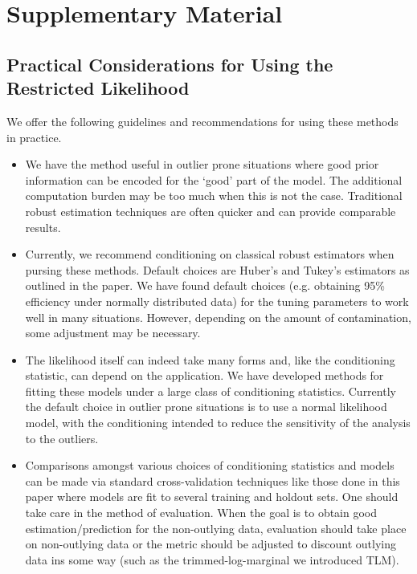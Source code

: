 \documentclass[ba]{imsart}
\begin{document}
\section{Supplementary Material}
\label{sec:appendix}

\subsection{Practical Considerations for Using the Restricted Likelihood}
We offer the following guidelines and recommendations for using these methods in practice. 
\begin{itemize}
\item We have the method useful in outlier prone situations where good prior information can be encoded for the `good' part of the model. The additional computation burden may be too much when this is not the case. Traditional robust estimation techniques are often quicker and can provide comparable results.
\item Currently, we recommend conditioning on classical robust estimators when pursing these methods. Default choices are Huber's and Tukey's estimators as outlined in the paper. We have found default choices (e.g. obtaining 95\% efficiency under normally distributed data) for the tuning parameters to work well in many situations. However, depending on the amount of contamination, some adjustment may be necessary. 
\item The likelihood itself can indeed take many forms and, like the conditioning statistic, can depend on the application. We have developed methods for fitting these models under a large class of conditioning statistics. Currently the default choice in outlier prone situations is to use a normal likelihood model, with the conditioning intended to reduce the sensitivity of the analysis to the outliers. 
\item Comparisons amongst various choices of conditioning statistics and models can be made via standard cross-validation techniques like those done in this paper where models are fit to several training and holdout sets. One should take care in the method of evaluation. When the goal is to obtain good estimation/prediction for the non-outlying data, evaluation should take place on non-outlying data or the metric should be adjusted to discount outlying data ins some way (such as the trimmed-log-marginal we introduced TLM).
\end{itemize}

\end{document}
